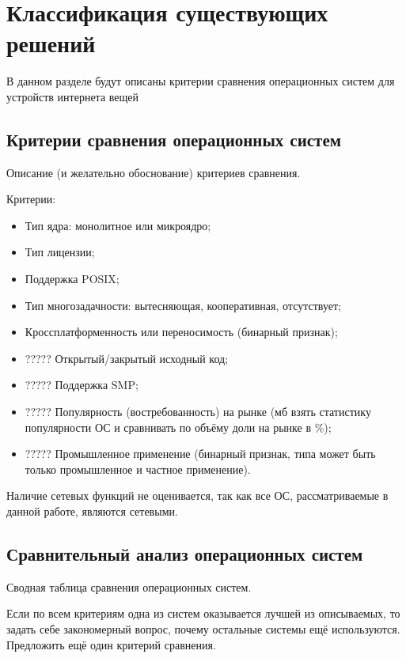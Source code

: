 \chapter{Классификация существующих решений}
\label{cha:classification}

В данном разделе будут описаны критерии сравнения операционных систем для устройств интернета вещей

\section{Критерии сравнения операционных систем}

Описание (и желательно обоснование) критериев сравнения.

Критерии:

\begin{itemize}
	\item Тип ядра: монолитное или микроядро;
	\item Тип лицензии;
	\item Поддержка POSIX;
	\item Тип многозадачности: вытесняющая, кооперативная, отсутствует;
	\item Кроссплатформенность или переносимость (бинарный признак);
	\item ????? Открытый/закрытый исходный код;
	\item ????? Поддержка SMP;
	\item ????? Популярность (востребованность) на рынке (мб взять статистику популярности ОС и сравнивать по объёму доли на рынке в \%);
	\item ????? Промышленное применение (бинарный признак, типа может быть только промышленное и частное применение).
\end{itemize}

Наличие сетевых функций не оценивается, так как все ОС, рассматриваемые в данной работе, являются сетевыми.

\section{Сравнительный анализ операционных систем}

Сводная таблица сравнения операционных систем. \newline

Если по всем критериям одна из систем оказывается лучшей из описываемых, то задать себе закономерный вопрос, почему остальные системы ещё используются. Предложить ещё один критерий сравнения.

